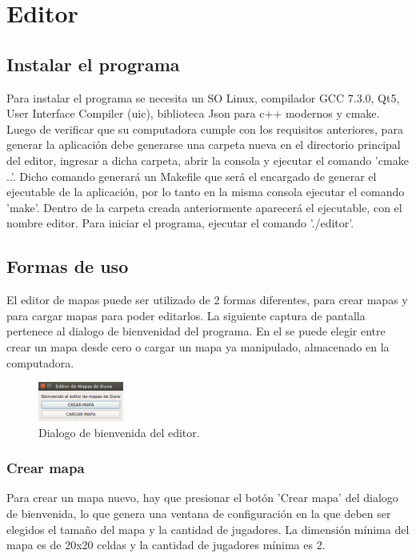 \documentclass[titlepage,a4paper,12pt]{article}
\begin{document}
\newpage
\section{Editor}

\subsection{Instalar el programa}

Para instalar el programa se necesita un SO Linux, compilador GCC 7.3.0, Qt5, User Interface Compiler (uic), biblioteca Json para c++ modernos y cmake. Luego de verificar que su computadora cumple con los requisitos anteriores, para generar la aplicación debe generarse una carpeta nueva en el directorio principal del editor, ingresar a dicha carpeta, abrir la consola y ejecutar el comando 'cmake ..'. Dicho comando generará un Makefile que será el encargado de generar el ejecutable de la aplicación, por lo tanto en la misma consola ejecutar el comando 'make'. Dentro de la carpeta creada anteriormente aparecerá el ejecutable, con el nombre editor. Para iniciar el programa, ejecutar el comando './editor'.\\

\subsection{Formas de uso}

El editor de mapas puede ser utilizado de 2 formas diferentes, para crear mapas y para cargar mapas para poder editarlos. La siguiente captura de pantalla pertenece al dialogo de bienvenidad del programa. En el se puede elegir entre crear un mapa desde cero o cargar un mapa ya manipulado, almacenado en la computadora.

\begin{figure}[H]
	\centering
	\includegraphics[width=0.25\textwidth]{../imagenes/bienvenida_editor.png}
	\caption{\label{fig:menu_editor} Dialogo de bienvenida del editor.}
\end{figure}

\subsubsection{Crear mapa}

Para crear un mapa nuevo, hay que presionar el botón 'Crear mapa' del dialogo de bienvenida, lo que genera una ventana de configuración en la que deben ser elegidos el tamaño del mapa y la cantidad de jugadores. La dimensión mínima del mapa es de 20x20 celdas y la cantidad de jugadores mínima es 2. \\
\end{document}
